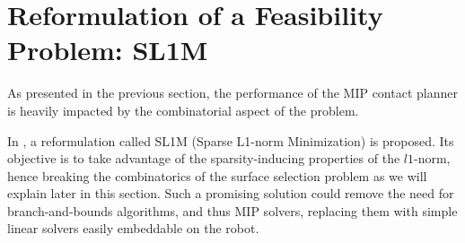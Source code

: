 \section{Reformulation of a Feasibility Problem: SL1M}
\label{sub:mip:sl1m}


As presented in the previous section, the performance of the MIP contact planner is heavily impacted by the combinatorial aspect of the problem.

In \cite{sl1m_v1, sl1m_v2}, a reformulation called SL1M (Sparse L1-norm Minimization) is proposed.
Its objective is to take advantage of the sparsity-inducing properties of the $l1$-norm, hence breaking the combinatorics of the surface selection problem as we will explain later in this section.
Such a promising solution could remove the need for branch-and-bounds algorithms, and thus MIP solvers, replacing them with simple linear solvers easily embeddable on the robot.



